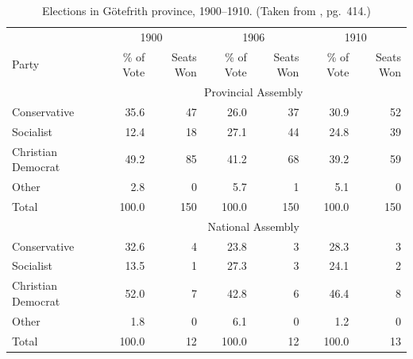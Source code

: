 \documentclass{icmmcm}
\begin{document}
{\begin{table}
\begin{center}
{\hspace{-1in}
\begin{minipage}{\textwidth}
\fontsize{10}{12}\selectfont
\begin{tabular}[c]{lrrrrrr}
\toprule
              & \multicolumn{2}{c}{1900} & \multicolumn{2}{c}{1906} & \multicolumn{2}{c}{1910}\\
\cmidrule(r){2-3}\cmidrule(lr){4-5}\cmidrule(l){6-7}
Party         & \% of Vote  & Seats Won  & \% of Vote  & Seats Won  & \% of Vote  & Seats Won \\
\midrule
\addlinespace
              & \multicolumn{6}{c}{Provincial Assembly}\\
\cmidrule{2-7}
Conservative  & 35.6        &  47        & 26.0        & 37         & 30.9        & 52\\
Socialist     & 12.4        &  18        & 27.1        & 44         & 24.8        & 39\\
Christian Democrat & 49.2   &  85        & 41.2        & 68         & 39.2        & 59\\
Other         & 2.8         &  0         & 5.7         & 1          & 5.1         & 0\\
\addlinespace
Total& 100.0       &  150       & 100.0       & 150        & 100.0       & 150\\
\addlinespace
              & \multicolumn{6}{c}{National Assembly}\\
\cmidrule{2-7}
Conservative  & 32.6        &   4        & 23.8        &  3         & 28.3        & 3\\
Socialist     & 13.5        &   1        & 27.3        &  3         & 24.1        & 2\\
Christian Democrat & 52.0   &   7        & 42.8        &  6         & 46.4        & 8\\
Other         & 1.8         &   0        & 6.1         &  0         & 1.2         & 0\\
\addlinespace
Total& 100.0       &  12        & 100.0       & 12         & 100.0       & 13\\
\bottomrule
\end{tabular}
\end{minipage}
}
\caption[Elections in G\"{o}tefrith province, 1900--1910]{Elections in
  G\"{o}tefrith province, 1900--1910.  (Taken from \cite{chicago},
  pg.~414.)}%
\label{tab:chicago-table}
\end{center}
\end{table}



}
\end{document}
